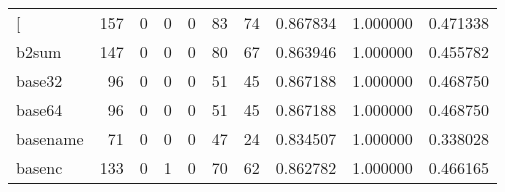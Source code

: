 \begin{longtable}{lrrrrrrrrr}
\bottomrule
\endlastfoot
{[}         &                                   157 &                                                  0 &                                                  0 &                                                  0 &                                                 83 &                                                 74 &                                           0.867834 &                               1.000000 &                             0.471338 \\
b2sum     &                                   147 &                                                  0 &                                                  0 &                                                  0 &                                                 80 &                                                 67 &                                           0.863946 &                               1.000000 &                             0.455782 \\
base32    &                                    96 &                                                  0 &                                                  0 &                                                  0 &                                                 51 &                                                 45 &                                           0.867188 &                               1.000000 &                             0.468750 \\
base64    &                                    96 &                                                  0 &                                                  0 &                                                  0 &                                                 51 &                                                 45 &                                           0.867188 &                               1.000000 &                             0.468750 \\
basename  &                                    71 &                                                  0 &                                                  0 &                                                  0 &                                                 47 &                                                 24 &                                           0.834507 &                               1.000000 &                             0.338028 \\
basenc    &                                   133 &                                                  0 &                                                  1 &                                                  0 &                                                 70 &                                                 62 &                                           0.862782 &                               1.000000 &                             0.466165 \\

\end{longtable}
